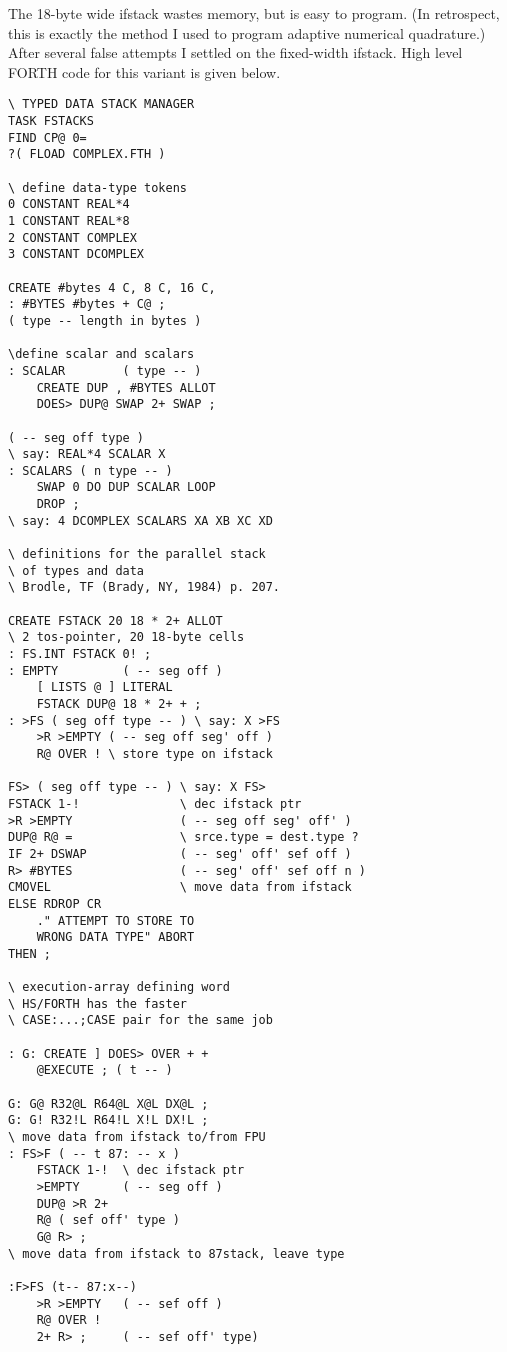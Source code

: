 The 18-byte wide ifstack wastes memory, but is easy to program. (In retrospect, this is exactly the method I used to program adaptive numerical quadrature.) After several false attempts I settled on the fixed-width ifstack. High level FORTH code for this variant is given below.
\begin{multicols}{2}
\begin{lstlisting}[basicstyle=\small,]
\ TYPED DATA STACK MANAGER
TASK FSTACKS
FIND CP@ 0=
?( FLOAD COMPLEX.FTH )

\ define data-type tokens
0 CONSTANT REAL*4
1 CONSTANT REAL*8
2 CONSTANT COMPLEX
3 CONSTANT DCOMPLEX

CREATE #bytes 4 C, 8 C, 16 C,
: #BYTES #bytes + C@ ; 
( type -- length in bytes )

\define scalar and scalars
: SCALAR        ( type -- ) 
    CREATE DUP , #BYTES ALLOT 
    DOES> DUP@ SWAP 2+ SWAP ;

( -- seg off type )
\ say: REAL*4 SCALAR X
: SCALARS ( n type -- )
    SWAP 0 DO DUP SCALAR LOOP
    DROP ;
\ say: 4 DCOMPLEX SCALARS XA XB XC XD

\ definitions for the parallel stack
\ of types and data 
\ Brodle, TF (Brady, NY, 1984) p. 207.

CREATE FSTACK 20 18 * 2+ ALLOT
\ 2 tos-pointer, 20 18-byte cells
: FS.INT FSTACK 0! ;
: EMPTY         ( -- seg off )
    [ LISTS @ ] LITERAL
    FSTACK DUP@ 18 * 2+ + ;
: >FS ( seg off type -- ) \ say: X >FS
    >R >EMPTY ( -- seg off seg' off )
    R@ OVER ! \ store type on ifstack

FS> ( seg off type -- ) \ say: X FS>
FSTACK 1-!              \ dec ifstack ptr
>R >EMPTY               ( -- seg off seg' off' )
DUP@ R@ =               \ srce.type = dest.type ? 
IF 2+ DSWAP             ( -- seg' off' sef off )
R> #BYTES               ( -- seg' off' sef off n )
CMOVEL                  \ move data from ifstack
ELSE RDROP CR 
    ." ATTEMPT TO STORE TO
    WRONG DATA TYPE" ABORT
THEN ;

\ execution-array defining word
\ HS/FORTH has the faster
\ CASE:...;CASE pair for the same job

: G: CREATE ] DOES> OVER + +
    @EXECUTE ; ( t -- )

G: G@ R32@L R64@L X@L DX@L ;
G: G! R32!L R64!L X!L DX!L ;
\ move data from ifstack to/from FPU
: FS>F ( -- t 87: -- x )
    FSTACK 1-!  \ dec ifstack ptr
    >EMPTY      ( -- seg off )
    DUP@ >R 2+
    R@ ( sef off' type )
    G@ R> ;
\ move data from ifstack to 87stack, leave type

:F>FS (t-- 87:x--)
    >R >EMPTY   ( -- sef off )
    R@ OVER !
    2+ R> ;     ( -- sef off' type)
\end{lstlisting}
\end{multicols}
 
